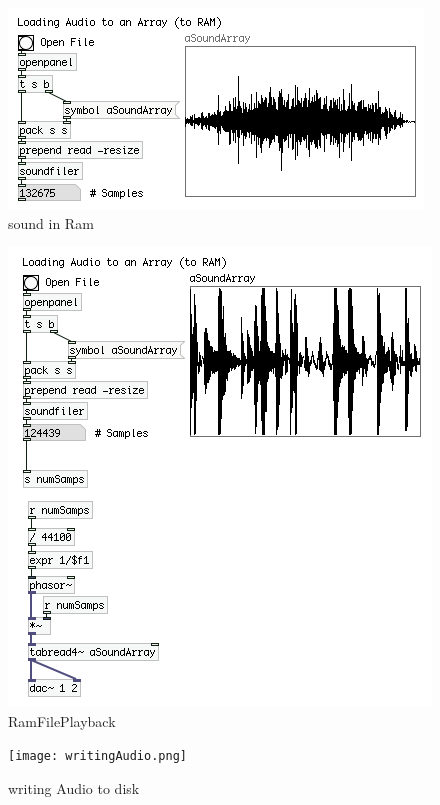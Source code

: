 \begin{figure}[H]
	\begin{center}
		\includegraphics[scale = 1]{img/soundFileToRam.png}
		\caption{sound in Ram}
		\label{fig:soundRam}
	\end{center}
\end{figure}


\begin{figure}[H]
	\begin{center}
		\includegraphics[scale = 1]{img/RamFilePlayback.png}
		\caption{RamFilePlayback}
		\label{fig:RamFilePlayback}
	\end{center}
\end{figure}



\begin{figure}[H]
	\begin{center}
		\texttt{[image: writingAudio.png]}
		\caption{writing Audio to disk}
		\label{fig:writing}
	\end{center}
\end{figure}


